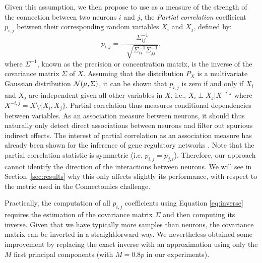 \documentclass[wcp]{jmlr}
\begin{document}
Given this assumption, we then propose to use as a measure of the
strength of the connection between two neurons $i$ and $j$, the
\textit{Partial correlation} coefficient $p_{i,j}$ between their corresponding
random variables $X_i$ and $X_j$, defined by:
\begin{equation}
p_{i,j} =
-\frac{\Sigma^{-1}_{ij}}{\sqrt{\Sigma^{-1}_{ii} \Sigma^{-1}_{jj}}}, \label{eq:inverse}
\end{equation}
where $\Sigma^{-1}$, known as the precision or concentration matrix, is the inverse of the covariance matrix $\Sigma$ of $X$. %
Assuming that the distribution $P_X$ is a multivariate Gaussian
distribution ${\cal N}(\mu,\Sigma)$, it can be shown that $p_{i,j}$ is
zero if and only if $X_i$ and $X_j$ are independent given all other
variables in $X$, i.e., $X_i \perp X_j|X^{-i,j}$ where $X^{-i,j}= X
\setminus\{X_i,X_j\}$. Partial correlation thus measures conditional
dependencies between variables. As an association measure between
neurons, it should thus naturally only detect direct associations
between neurons and filter out spurious indirect effects. The interest
of partial correlation as an association measure has already been
shown for the inference of gene regulatory networks
\citep{de2004discovery,Schafer:2005}.
Note that the partial correlation statistic is symmetric
(i.e. $p_{i,j}=p_{j,i}$). Therefore, our approach cannot identify the
direction of the interactions between neurons. We will see in
Section~\ref{sec:results} why this only affects slightly its
performance, with respect to the metric used in the Connectomics
challenge.

Practically, the computation of all $p_{i,j}$ coefficients using Equation
\ref{eq:inverse} requires the estimation of the covariance matrix $\Sigma$
and then computing its inverse. Given that we have typically more
samples than neurons, the covariance matrix can be inverted in a
straightforward way. We nevertheless obtained some improvement by
replacing the exact inverse with an approximation using only the $M$
first principal components \citep{bishop2006pattern} (with
$M=0.8 p$ in our experiments).
\end{document}
